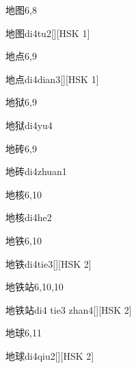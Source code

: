 \begin{entry}{地图}{6,8}
  \begin{phonetics}{地图}{di4tu2}[][HSK 1]
  \end{phonetics}
\end{entry}

\begin{entry}{地点}{6,9}
  \begin{phonetics}{地点}{di4dian3}[][HSK 1]
  \end{phonetics}
\end{entry}

\begin{entry}{地狱}{6,9}
  \begin{phonetics}{地狱}{di4yu4}
  \end{phonetics}
\end{entry}

\begin{entry}{地砖}{6,9}
  \begin{phonetics}{地砖}{di4zhuan1}
  \end{phonetics}
\end{entry}

\begin{entry}{地核}{6,10}
  \begin{phonetics}{地核}{di4he2}
  \end{phonetics}
\end{entry}

\begin{entry}{地铁}{6,10}
  \begin{phonetics}{地铁}{di4tie3}[][HSK 2]
  \end{phonetics}
\end{entry}

\begin{entry}{地铁站}{6,10,10}
  \begin{phonetics}{地铁站}{di4 tie3 zhan4}[][HSK 2]
  \end{phonetics}
\end{entry}

\begin{entry}{地球}{6,11}
  \begin{phonetics}{地球}{di4qiu2}[][HSK 2]
  \end{phonetics}
\end{entry}

